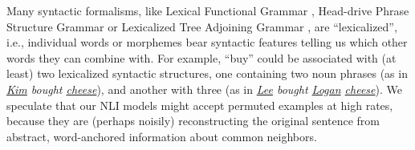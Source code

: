 \documentclass[letterpaper, 12pt]{report}
\newcommand{\PermAcc}{Permutation Acceptance} %
\begin{document}




Many syntactic formalisms, like Lexical Functional Grammar \citep[LFG]{kaplan-bresnan-1995-formal, bresnan-etal-2015-lexical}, Head-drive Phrase Structure Grammar \citep[HPSG]{pollard-sag-1994-head} or Lexicalized Tree Adjoining Grammar \citep[LTAG]{schabes-etal-1988-parsing, abeille-1990-lexical}, are ``lexicalized'', i.e., individual words or morphemes bear syntactic features telling us which other words they can combine with. For example, ``buy'' could be associated with (at least) two lexicalized syntactic structures, one containing two noun phrases (as in \textit{\underline{Kim} bought \underline{cheese}}), and another with three (as in \textit{\underline{Lee} bought \underline{Logan} \underline{cheese}}). %
We speculate that our NLI models might accept permuted examples at high rates, %
because they are (perhaps noisily) reconstructing the original sentence from abstract, word-anchored information about common neighbors.
\end{document}
